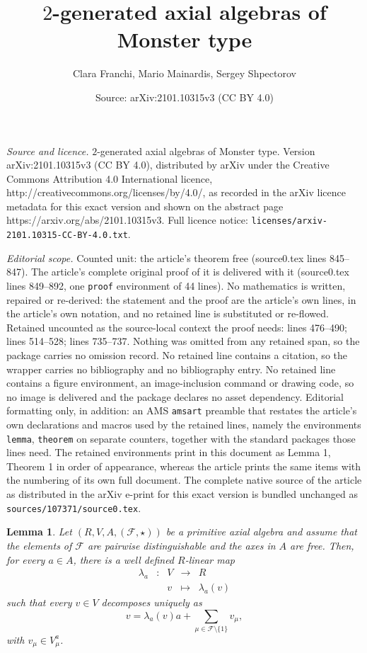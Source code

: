 \documentclass[10pt,a4paper]{amsart}
\title{$2$-generated axial algebras of Monster type}
\author{Clara Franchi, Mario Mainardis, Sergey Shpectorov}
\date{Source: arXiv:2101.10315v3 (CC BY 4.0)}
\newtheorem{lemma}{Lemma}
\begin{document}
\maketitle

\noindent\emph{Source and licence.} $2$-generated axial algebras of Monster type. Version arXiv:2101.10315v3 (CC BY 4.0), distributed by arXiv under the Creative Commons Attribution 4.0 International licence, http://creativecommons.org/licenses/by/4.0/, as recorded in the arXiv licence metadata for this exact version and shown on the abstract page https://arxiv.org/abs/2101.10315v3. Full licence notice: \texttt{licenses/arxiv-2101.10315-CC-BY-4.0.txt}.\par\smallskip

\noindent\textit{Editorial scope.} Counted unit: the article's theorem free (source0.tex lines 845--847). The article's complete original proof of it is delivered with it (source0.tex lines 849--892, one \texttt{proof} environment of 44 lines). No mathematics is written, repaired or re-derived: the statement and the proof are the article's own lines, in the article's own notation, and no retained line is substituted or re-flowed.  Retained uncounted as the source-local context the proof needs: lines 476--490; lines 514--528; lines 735--737.  Nothing was omitted from any retained span, so the package carries no omission record.  No retained line contains a citation, so the wrapper carries no bibliography and no bibliography entry.  No retained line contains a figure environment, an image-inclusion command or drawing code, so no image is delivered and the package declares no asset dependency.  Editorial formatting only, in addition: an AMS \texttt{amsart} preamble that restates the article's own declarations and macros used by the retained lines, namely the environments \texttt{lemma}, \texttt{theorem} on separate counters, together with the standard packages those lines need.  The retained environments print in this document as Lemma 1, Theorem 1 in order of appearance, whereas the article prints the same items with the numbering of its own full document.  The complete native source of the article as distributed in the arXiv e-print for this exact version is bundled unchanged as \texttt{sources/107371/source0.tex}.
\begin{lemma}\label{lambdafunction}
Let $(R,V, A, (\mathcal F, \star))$ be a primitive axial algebra and assume that the elements of $\mathcal F$ are pairwise distinguishable and the axes in $A$ are free. Then, for every $a\in A$, there is a well defined $R$-linear map 
\begin{equation}
\label{lambda}
\begin{array}{rcccc}
\lambda_a & \colon & V& \to & R\\
&& v &\mapsto & \lambda_a(v)
\end{array}
\end{equation}
such that every $v\in V$ decomposes uniquely as
\begin{equation}\label{justapply}
v=\lambda_a(v)a+\sum_{\mu\in \mathcal F\setminus \{1\}}v_\mu, 
\end{equation}
with $v_\mu\in V_\mu^a$.
\end{lemma}
\end{document}

